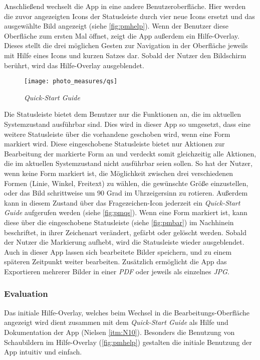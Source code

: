 Anschließend wechselt die App in eine andere Benutzeroberfläche.
Hier werden die zuvor angezeigten Icons der Statusleiste durch vier neue Icons ersetzt und das ausgewählte Bild angezeigt (siehe \autoref{fig:pmhelp}).
Wenn der Benutzer diese Oberfläche zum ersten Mal öffnet, zeigt die App außerdem ein Hilfe-Overlay.
Dieses stellt die drei möglichen Gesten zur Navigation in der Oberfläche jeweils mit Hilfe eines Icons und kurzen Satzes dar. 
Sobald der Nutzer den Bildschirm berührt, wird das Hilfe-Overlay ausgeblendet. \\

\begin{wrapfigure}{R}{0.4\textwidth}
  \centering
  \texttt{[image: photo\_measures/qs]}
  \caption{\emph{Quick-Start Guide}}
  \label{fig:pmqs}
\end{wrapfigure}

Die Statusleiste bietet dem Benutzer nur die Funktionen an, die im aktuellen Systemzustand ausführbar sind.
Dies wird in dieser App so umgesetzt, dass eine weitere Statusleiste über die vorhandene geschoben wird, wenn eine Form markiert wird.
Diese eingeschobene Statusleiste bietet nur Aktionen zur Bearbeitung der markierte Form an und verdeckt somit gleichzeitig alle Aktionen, die im aktuellen Systemzustand nicht ausführbar seien sollen.
So hat der Nutzer, wenn keine Form markiert ist, die Möglichkeit zwischen drei verschiedenen Formen (Linie, Winkel, Freitext) zu wählen, die gewünschte Größe einzustellen, oder das Bild schrittweise um $90$ Grad im Uhrzeigersinn zu rotieren.
Außerdem kann in diesem Zustand über das Fragezeichen-Icon jederzeit ein \emph{Quick-Start Guide} aufgerufen werden (siehe \autoref{fig:pmqs}).
Wenn eine Form markiert ist, kann diese über die eingeschobene Statusleiste (siehe \autoref{fig:pmbar}) im Nachhinein beschriftet, in ihrer Zeichenart verändert, gefärbt oder gelöscht werden.
Sobald der Nutzer die Markierung aufhebt, wird die Statusleiste wieder ausgeblendet. \\

Auch in dieser App lassen sich bearbeitete Bilder speichern, und zu einem späteren Zeitpunkt weiter bearbeiten.
Zusätzlich ermöglicht die App das Exportieren mehrerer Bilder in einer \emph{PDF} oder jeweils als einzelnes \emph{JPG}.

\subsubsection{Evaluation}\label{subsec:pmeva}
Das initiale Hilfe-Overlay, welches beim Wechsel in die Bearbeitungs-Oberfläche angezeigt wird dient zusammen mit dem \emph{Quick-Start Guide} als Hilfe und Dokumentation der App (Nielsen \autoref{itm:N10}).
Besonders die Benutzung von Schaubildern im Hilfe-Overlay (\autoref{fig:pmhelp}) gestalten die initiale Benutzung der App intuitiv und einfach. \\

